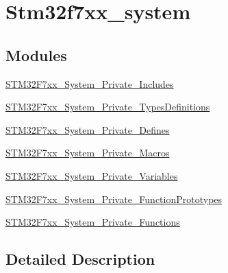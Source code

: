 \hypertarget{group__stm32f7xx__system}{}\section{Stm32f7xx\+\_\+system}
\label{group__stm32f7xx__system}
\subsection*{Modules}
\begin{DoxyCompactItemize}
\item 
\hyperlink{group___s_t_m32_f7xx___system___private___includes}{S\+T\+M32\+F7xx\+\_\+\+System\+\_\+\+Private\+\_\+\+Includes}
\item 
\hyperlink{group___s_t_m32_f7xx___system___private___types_definitions}{S\+T\+M32\+F7xx\+\_\+\+System\+\_\+\+Private\+\_\+\+Types\+Definitions}
\item 
\hyperlink{group___s_t_m32_f7xx___system___private___defines}{S\+T\+M32\+F7xx\+\_\+\+System\+\_\+\+Private\+\_\+\+Defines}
\item 
\hyperlink{group___s_t_m32_f7xx___system___private___macros}{S\+T\+M32\+F7xx\+\_\+\+System\+\_\+\+Private\+\_\+\+Macros}
\item 
\hyperlink{group___s_t_m32_f7xx___system___private___variables}{S\+T\+M32\+F7xx\+\_\+\+System\+\_\+\+Private\+\_\+\+Variables}
\item 
\hyperlink{group___s_t_m32_f7xx___system___private___function_prototypes}{S\+T\+M32\+F7xx\+\_\+\+System\+\_\+\+Private\+\_\+\+Function\+Prototypes}
\item 
\hyperlink{group___s_t_m32_f7xx___system___private___functions}{S\+T\+M32\+F7xx\+\_\+\+System\+\_\+\+Private\+\_\+\+Functions}
\end{DoxyCompactItemize}


\subsection{Detailed Description}
